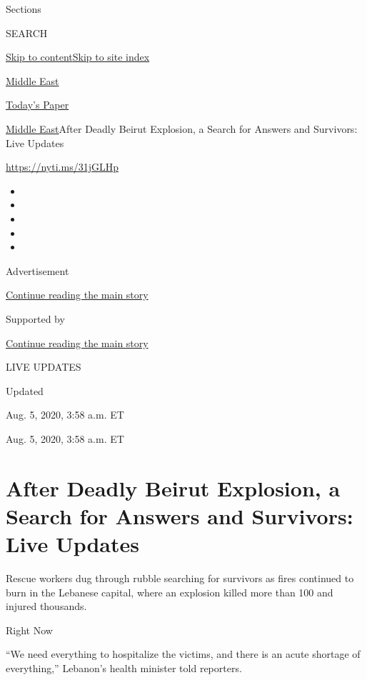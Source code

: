 Sections

SEARCH

\protect\hyperlink{site-content}{Skip to
content}\protect\hyperlink{site-index}{Skip to site index}

\href{https://www.nytimes3xbfgragh.onion/section/world/middleeast}{Middle
East}

\href{https://myaccount.nytimes3xbfgragh.onion/auth/login?response_type=cookie\&client_id=vi}{}

\href{https://www.nytimes3xbfgragh.onion/section/todayspaper}{Today's
Paper}

\href{/section/world/middleeast}{Middle East}\textbar{}After Deadly
Beirut Explosion, a Search for Answers and Survivors: Live Updates

\url{https://nyti.ms/31jGLHp}

\begin{itemize}
\item
\item
\item
\item
\item
\end{itemize}

Advertisement

\protect\hyperlink{after-top}{Continue reading the main story}

Supported by

\protect\hyperlink{after-sponsor}{Continue reading the main story}

LIVE UPDATES

Updated~

Aug. 5, 2020, 3:58 a.m. ET

Aug. 5, 2020, 3:58 a.m. ET

\hypertarget{after-deadly-beirut-explosion-a-search-for-answers-and-survivors-live-updates}{%
\section{After Deadly Beirut Explosion, a Search for Answers and
Survivors: Live
Updates}\label{after-deadly-beirut-explosion-a-search-for-answers-and-survivors-live-updates}}

Rescue workers dug through rubble searching for survivors as fires
continued to burn in the Lebanese capital, where an explosion killed
more than 100 and injured thousands.

Right Now

``We need everything to hospitalize the victims, and there is an acute
shortage of everything,'' Lebanon's health minister told reporters.

